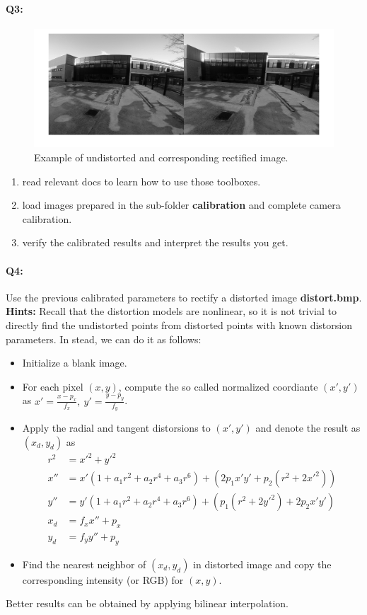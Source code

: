 \documentclass[a4paper]{article}
\begin{document}
\paragraph{Q3:} 
\begin{figure}[!b]
\centering
\includegraphics[scale=0.2]{figures/rec.png}
\caption{Example of undistorted and corresponding rectified image.}
\end{figure}
\begin{enumerate}
\item read relevant docs to learn how to use those toolboxes.
\item load images prepared in the sub-folder \textbf{calibration} and complete camera calibration.
\item verify the calibrated results and interpret the results you get.
\end{enumerate}
\paragraph{Q4:} 
Use the previous calibrated parameters to rectify a distorted image \textbf{distort.bmp}. 
\textbf{Hints:}
Recall that the distortion models are nonlinear, so it is not trivial to directly find the undistorted points from distorted points with known distorsion parameters. In stead, we can do it as follows:
\begin{itemize}
	\item Initialize a blank image.
	\item For each pixel $(x,y)$, compute the so called normalized coordiante $(x',y')$ as $x'=\frac{x-p_x}{f_x},\ y'=\frac{y-p_y}{f_y}$.
	\item Apply the radial and tangent distorsions to $(x',y')$ and denote the result as $(x_d,y_d)$ as
	\begin{align*}
		r^2 &= x'^2+y'^2 \\
		x'' &= x'(1+a_1r^2+a_2r^4+a_3r^6)+(2p_1x'y'+p_2(r^2+2x'^2)) \\
		y'' &= y'(1+a_1r^2+a_2r^4+a_3r^6)+(p_1(r^2+2y'^2)+2p_2x'y') \\
		x_d &= f_xx''+p_x\\
		y_d &=f_yy''+p_y
	\end{align*}

	\item Find the nearest neighbor of $(x_d,y_d)$ in distorted image and copy the corresponding intensity (or RGB) for $(x,y)$. 
\end{itemize}
Better results can be obtained by applying bilinear interpolation.
\end{document}
